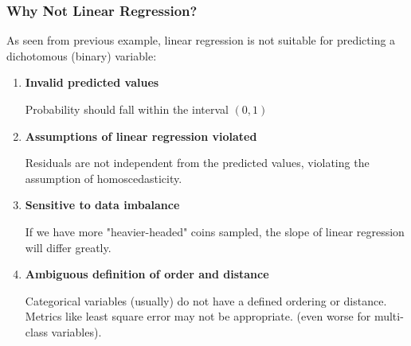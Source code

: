 \documentclass[10pt,aspectratio=169]{beamer}
\begin{document}
\begin{frame}
  \frametitle{Why Not Linear Regression?}
  As seen from previous example, linear regression is not
  suitable for predicting a dichotomous (binary) variable:

  \begin{enumerate}
    \vfill \item \textbf{Invalid predicted values}

    Probability should fall within the interval $(0, 1)$
  
    \vfill \item \textbf{Assumptions of linear regression violated}

    Residuals are not independent from the predicted values, violating
    the assumption of homoscedasticity.


  
    \vfill \item \textbf{Sensitive to data imbalance}

    If we have more "heavier-headed" coins sampled, the slope of
    linear regression will differ greatly.

    
    \vfill \item \textbf{Ambiguous definition of order and distance}

    Categorical variables (usually) do not have a defined ordering or
    distance. Metrics like least square error may not be appropriate.
    (even worse for multi-class variables).
    
  \end{enumerate}
\end{frame}
\end{document}

